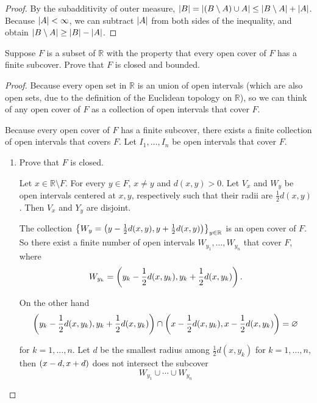 \begin{proof}
    By the subadditivity of outer measure, $\left\vert{B}\right\vert = \left\vert{(B\setminus A)\cup A}\right\vert\leq \left\vert{B\setminus A}\right\vert + \left\vert{A}\right\vert$. Because $\left\vert{A}\right\vert < \infty$, we can subtract $\left\vert{A}\right\vert$ from both sides of the inequality, and obtain $\left\vert{B\setminus A}\right\vert\geq \left\vert{B}\right\vert - \left\vert{A}\right\vert$.
\end{proof}
\newpage

\begin{exercise}\label{chapter2:sectionA:exercise4}
    Suppose $F$ is a subset of $\mathbb{R}$ with the property that every open cover of $F$ has a finite subcover. Prove that $F$ is closed and bounded.
\end{exercise}

\begin{proof}
    Because every open set in $\mathbb{R}$ is an union of open intervals (which are also open sets, due to the definition of the Euclidean topology on $\mathbb{R}$), so we can think of any open cover of $F$ as a collection of open intervals that cover $F$.

    Because every open cover of $F$ has a finite subcover, there exists a finite collection of open intervals that covers $F$. Let $I_{1}, \ldots, I_{n}$ be open intervals that cover $F$.

    \begin{enumerate}[label={(\alph*)}]
        \item Prove that $F$ is closed.

              Let $x\in \mathbb{R}\setminus F$. For every $y\in F$, $x\ne y$ and $d(x, y) > 0$. Let $V_{x}$ and $W_{y}$ be open intervals centered at $x, y$, respectively such that their radii are $\frac{1}{2}d(x, y)$. Then $V_{x}$ and $Y_{y}$ are disjoint.

              The collection ${\left\{W_{y} = \left({y - \frac{1}{2}d(x, y), y + \frac{1}{2}d(x, y)}\right)\right\}}_{y\in\mathbb{R}}$ is an open cover of $F$. So there exist a finite number of open intervals $W_{y_{1}}, \ldots, W_{y_{n}}$ that cover $F$, where
              \[
                  W_{y_{k}} = \left({y_{k}-\frac{1}{2}d(x, y_{k}), y_{k}+\frac{1}{2}d(x, y_{k})}\right).
              \]

              On the other hand
              \[
                  \left({y_{k}-\frac{1}{2}d(x, y_{k}), y_{k}+\frac{1}{2}d(x, y_{k})}\right) \cap \left({x-\frac{1}{2}d(x, y_{k}), x-\frac{1}{2}d(x, y_{k})}\right) = \varnothing
              \]

              for $k = 1,\ldots,n$. Let $d$ be the smallest radius among $\frac{1}{2}d(x, y_{k})$ for $k = 1,\ldots,n$, then $\left({x - d, x + d}\right)$ does not intersect the subcover
              \[
                  W_{y_{1}}\cup\cdots\cup W_{y_{n}}
              \]


\end{enumerate}
\end{proof}
